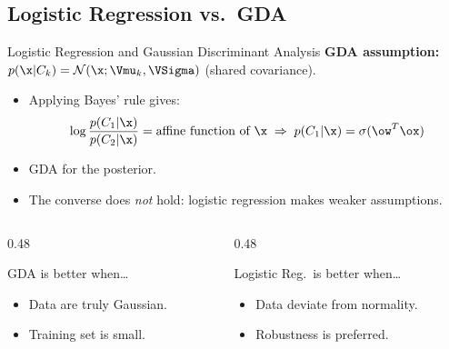 \subsection{Logistic Regression vs.\ GDA}

\begin{frame}{Logistic Regression and Gaussian Discriminant Analysis}
  \textbf{GDA assumption:} $p(\x|C_k) = \mathcal{N}(\x;\Vmu_k,\VSigma)$ (shared covariance).\\[0.4em]
  \begin{itemize}
    \item Applying Bayes' rule gives:
      \[
        \log\frac{p(C_1|\x)}{p(C_2|\x)} = \text{affine function of } \x
        \;\Rightarrow\; p(C_1|\x) = \sigma(\ow^T\ox)
      \]
    \item GDA  for the posterior.
    \item The converse does \emph{not} hold: logistic regression makes weaker assumptions.
  \end{itemize}
  \vspace{0.3cm}
  \begin{columns}[T]
    \begin{column}{0.48\textwidth}
      \begin{block}{GDA is better when\ldots}
        \begin{itemize}
          \item Data are truly Gaussian.
          \item Training set is small.
        \end{itemize}
      \end{block}
    \end{column}
    \begin{column}{0.48\textwidth}
      \begin{block}{Logistic Reg.\ is better when\ldots}
        \begin{itemize}
          \item Data deviate from normality.
          \item Robustness is preferred.
        \end{itemize}
      \end{block}
    \end{column}
  \end{columns}
\end{frame}


